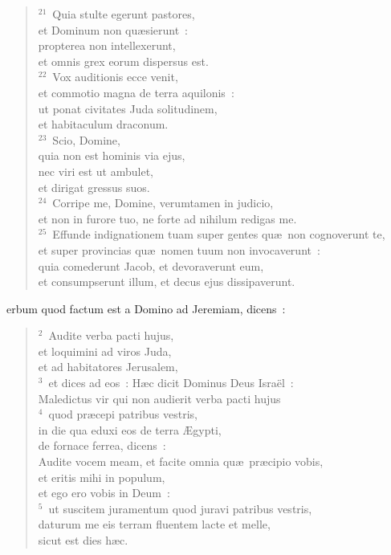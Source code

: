 \begin{flushleft}
\begin{verse}
${}^{21}$~Quia stulte egerunt pastores,\\ et Dominum non qu\ae sierunt~:\\ propterea non intellexerunt,\\ et omnis grex eorum dispersus est.\\
${}^{22}$~Vox auditionis ecce venit,\\ et commotio magna de terra aquilonis~:\\ ut ponat civitates Juda solitudinem,\\ et habitaculum draconum.\\
${}^{23}$~Scio, Domine,\\ quia non est hominis via ejus,\\ nec viri est ut ambulet,\\ et dirigat gressus suos.\\
${}^{24}$~Corripe me, Domine, verumtamen in judicio,\\ et non in furore tuo, ne forte ad nihilum redigas me.\\
${}^{25}$~Effunde indignationem tuam super gentes qu\ae\ non cognoverunt te,\\ et super provincias qu\ae\ nomen tuum non invocaverunt~:\\ quia comederunt Jacob, et devoraverunt eum,\\ et consumpserunt illum, et decus ejus dissipaverunt.\end{verse}\end{flushleft}



\bchapter
{}erbum quod factum est a Domino ad Jeremiam, dicens~:
\begin{flushleft}\begin{verse}\vspace{6pt}${}^{2}$~Audite verba pacti hujus,\\ et loquimini ad viros Juda,\\ et ad habitatores Jerusalem,\\
${}^{3}$~et dices ad eos~: H\ae c dicit Dominus Deus Isra\"el~:\\ Maledictus vir qui non audierit verba pacti hujus\\
${}^{4}$~quod pr\ae cepi patribus vestris,\\ in die qua eduxi eos de terra \AE gypti,\\ de fornace ferrea, dicens~:\\ Audite vocem meam, et facite omnia qu\ae\ pr\ae cipio vobis,\\ et eritis mihi in populum,\\ et ego ero vobis in Deum~:\\
${}^{5}$~ut suscitem juramentum quod juravi patribus vestris,\\ daturum me eis terram fluentem lacte et melle,\\ sicut est dies h\ae c.\end{verse}\end{flushleft}

